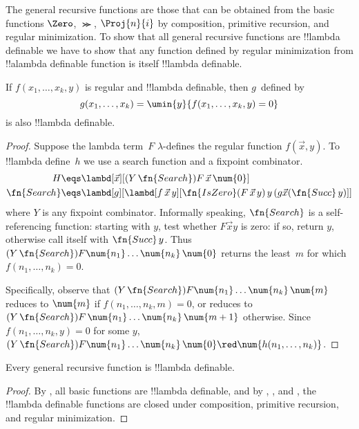 \documentclass[../../../include/open-logic-section]{subfiles}
\begin{document}

The general recursive functions are those that can be obtained from
the basic functions $\Zero$, $\Succ$, $\Proj{n}{i}$ by composition,
primitive recursion, and regular minimization. To show that all
general recursive functions are !!{lambda definable} we have to show
that any function defined by regular minimization from !!a{lambda
  definable} function is itself !!{lambda definable}.

\begin{lem}
   If $f(x_1, \dots, x_k, y)$ is regular and
  !!{lambda definable}, then $g$~defined by
  \[
  g(x_1, \dots, x_k) = \umin{y}{f(x_1,\dots,x_k, y) = 0}
  \]
  is also !!{lambda definable}.
\end{lem}

\begin{proof}
  Suppose the lambda term~$F$ $\lambda$-defines the regular
  function $f(\vec x, y)$. To !!{lambda define}~$h$ we use a search
  function and a fixpoint combinator.
  \begin{align*}
    H & \eqs \lambd[\vec x][(Y \, \fn{Search}) F\, \vec{x}\, \num{0}]  \\
    \fn{Search} &\eqs \lambd[g][\lambd[f\,\vec{x}\,y][
        \fn{IsZero} (F\, \vec{x}\, y)\, y\, (g \vec{x} (\fn{Succ}\, y)]]
  \end{align*}
  where $Y$ is any fixpoint combinator. Informally speaking,
  $\fn{Search}$ is a self-referencing function: starting with $y$,
  test whether $F \vec x y$ is zero: if so, return $y$, otherwise call
  itself with $\fn{Succ}\, y$. Thus $(Y \, \fn{Search}) F
  \num{n_1}\dots\num{n_k}\,\num{0}$ returns the least~$m$ for which $f(n_1,
  \dots, n_k) = 0$.
  
  Specifically, observe that $(Y \, \fn{Search}) F \num{n_1}
  \dots\num{n_k}\, \num{m}$ reduces to $\num{m}$ if $f(n_1, \dots,
  n_k, m) = 0$, or reduces to $(Y \, \fn{Search}) F\, \num{n_1}
  \dots\num{n_k}\, \num{m+1}$ otherwise. Since $f(n_1, \dots, n_k, y)
  = 0$ for some $y$, $(Y \, \fn{Search}) F \num{n_1}
  \dots\num{n_k}\,\num{0} \red \num{h(n_1, \dots, n_k)}$.
\end{proof}


\begin{prop}
  Every general recursive function is !!{lambda definable}.
\end{prop}

\begin{proof}
 By , all basic functions are
 !!{lambda definable}, and by ,
 , and , the !!{lambda definable}
 functions are closed under composition, primitive recursion, and
 regular minimization.
\end{proof}
\end{document}
